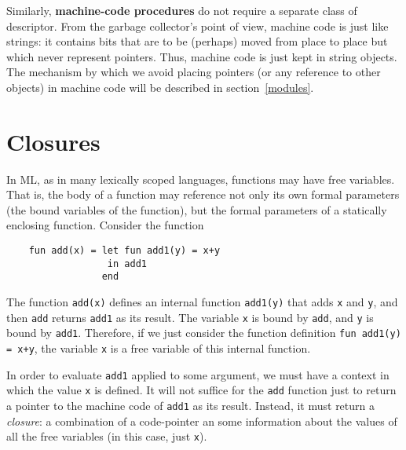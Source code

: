 Similarly, {\bf machine-code procedures}
 do not require a separate class
of descriptor.  From the garbage collector's point of view, machine
code is just like strings: it contains bits that are to be (perhaps)
moved from place to place but which never represent pointers.
Thus, machine code is just kept in string objects.  The mechanism by
which we avoid placing pointers
(or any reference to other objects)
in machine code will be described in section~\ref{modules}.

\section{Closures}
\label{closures}
In ML, as in many lexically scoped languages, functions may have free
variables.  That is, the body of a function may reference not only its
own formal parameters
(the bound variables of the function), but the
formal parameters of a statically enclosing function.  Consider the
function 
\begin{verbatim}
    fun add(x) = let fun add1(y) = x+y
                  in add1
                 end
\end{verbatim}
The function \verb"add(x)" defines an internal function \verb"add1(y)" that
adds \verb"x" and \verb"y", and then \verb"add" returns \verb"add1" as its
result.  The variable \verb"x" is bound by \verb"add", and
\verb"y" is bound by \verb"add1".  Therefore, if we just consider the
function definition \verb"fun add1(y) = x+y", the variable \verb"x"
is a free variable of this internal function.

In order to evaluate \verb"add1" applied to some argument, we must have
a context in which the value \verb"x" is defined.  It will not suffice
for the \verb"add" function just to return a pointer to the machine code
of \verb"add1" as its result.  Instead, it must return a {\em closure}:
a combination of a code-pointer an some information about the values of
all the free variables (in this case, just \verb"x").

